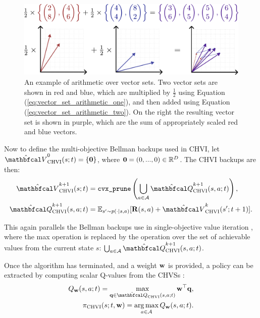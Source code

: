         \begin{figure}
            \centering\includegraphics[width=1.0\textwidth]{figures/ch2/ch_arithmetic.pdf} 
            \caption{An example of arithmetic over vector sets. Two vector sets are shown in red and blue, which are multiplied by $\frac{1}{2}$ using Equation (\ref{eq:vector_set_arithmetic_one}), and then added using Equation (\ref{eq:vector_set_arithmetic_two}). On the right the resulting vector set is shown in purple, which are the sum of appropriately scaled red and blue vectors.}
            \label{fig:vectorset_arithmetic}
        \end{figure}

        Now to define the multi-objective Bellman backups used in CHVI, let $\Vchvi^0(s;t) = \{ \bff{0} \}$, where $\mathbf{0}=(0,...,0)\in\mathbb{R}^D$. The CHVI backups are then:
        \begin{align}
            \Vchvi^{k+1}(s;t) &= \cprune \left( \bigcup_{a\in\cl{A}} \Qchvi^{k+1}(s,a;t) \right), \label{eq:chvi_v_backup} \\
            \Qchvi^{k+1}(s,a;t) &= \bb{E}_{s'\sim p(\cdot|s,a)} [\bff{R}(s,a) + \Vchvi^k(s';t+1)]. \label{eq:chvi_q_backup}
        \end{align}
        
        This again parallels the Bellman backups use in single-objective value iteration , where the max operation is replaced by the \cprune\ewe operation over the set of achievable values from the current state $s$: $\bigcup_{a\in\cl{A}} \Qchvi^{k+1}(s,a;t)$.
        
        Once the algorithm has terminated, and a weight $\mathbf{w}$ is provided, a policy can be extracted by computing scalar Q-values from the CHVSs \cite{chvi}:
        \begin{align}
            Q_{\bff{w}}(s,a;t) = \max_{\bff{q}\in\Qchvi(s,a;t)} \bff{w}^\top \bff{q}, \label{eq:chvi_scalar_q_fn} \\
            \pichvi(s;t,\bff{w}) = \argmax_{a\in\cl{A}} Q_{\bff{w}}(s,a;t). \label{eq:chvi_policy}
        \end{align}


